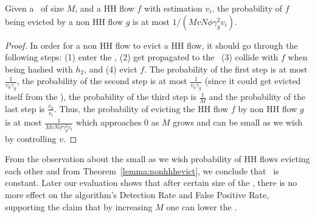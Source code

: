 \begin{theorem}
\label{lemma:nonhhhevict}
Given a \cs\ of size $M$, and a HH flow $f$ with estimation $v_i$, the probability of $f$ being evicted by a non HH flow $g$ is at most $1/(M v N \phi \gamma_g^2 v_i)$.
\end{theorem}
\begin{proof}
In order for a non HH flow to evict a HH flow, it should go through the following steps: (1) enter the \sfa, (2) get propagated to the \cs\, (3) collide with $f$ when being hashed with $h_2$, and (4) evict $f$. The probability of the first step is at most $\frac{1}{v_0 \gamma_g}$, the probability of the second step is at most $\frac{1}{v_0 \gamma_g}$ (since it could get evicted itself from the \sfa), the probability of the third step is $\frac{1}{M}$ and the probability of the last step is $\frac{v_0}{v_i}$. Thus, the probability of evicting the HH flow $f$ by non HH flow $g$ is at most $\frac{1}{M v N \phi \gamma_g^2 v_i}$ which approaches $0$ as $M$ grows and can be small as we wish by controlling $v$.
\end{proof}

From the observation about the small as we wish probability of HH flows evicting each other and from Theorem~\ref{lemma:nonhhhevict}, we conclude that \eve\ is constant. Later our evaluation shows that after certain size of the \cs, there is no more effect on the algorithm's Detection Rate and False Positive Rate, supporting the claim that by increasing $M$ one can lower the \eve.


